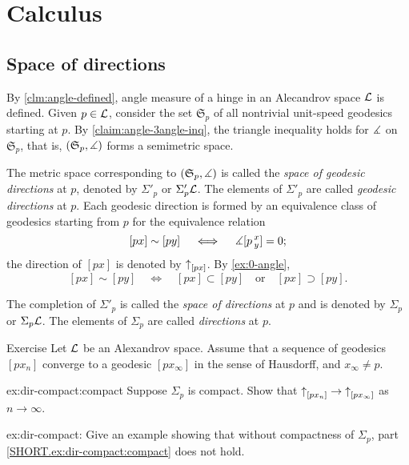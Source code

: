 
\chapter{Calculus}\label{chap:derivative}

\section{Space of directions} 
\label{sec:space+directions}

By \ref{clm:angle-defined}, angle measure of a hinge in an Alecandrov space $\mathcal{L}$ is defined.
Given $p\in \mathcal{L}$, consider the set $\mathfrak{S}_p$ of all nontrivial unit-speed geodesics starting at $p$.
By \ref{claim:angle-3angle-inq}, the triangle inequality holds for $\measuredangle$ on $\mathfrak{S}_p$,
that is, $(\mathfrak{S}_p,\measuredangle)$ 
forms a semimetric space.

The metric space corresponding to  $(\mathfrak{S}_p,\measuredangle)$ is called the \emph{space of geodesic directions} at $p$, denoted by $\Sigma'_p$ or $\Sigma'_p\mathcal{L}$.
The elements of $\Sigma'_p$ are called \emph{geodesic directions} at $p$.
Each geodesic direction is formed by an equivalence class of geodesics starting from $p$ 
for the equivalence relation 
\[[px]\sim[py]\quad \iff\quad \measuredangle[p\,{}^{x}_{y}]=0;\]
the direction of $[px]$ is denoted by ${\uparrow}_{[{p}{x}]} $.
By \ref{ex:0-angle}, 
\[[px]\sim[py]
\quad\iff\quad
[px]\subset [py]
\quad\text{or}\quad
[px]\supset[py].
\]
 
The completion of $\Sigma'_p$ is called the \emph{space of directions} at $p$ and is denoted by $\Sigma_p$ or $\Sigma_p\mathcal{L}$.
The elements of $\Sigma_p$ are called \emph{directions} at $p$.

\begin{thm}{Exercise}\label{ex:dir-compact}
Let $\mathcal{L}$ be an Alexandrov space.
Assume that a sequence of geodesics $[px_n]$ converge to a geodesic $[px_\infty]$ in the sense of Hausdorff,
and $x_\infty\ne p$.

\begin{subthm}{ex:dir-compact:compact}
Suppose $\Sigma_p$ is compact.
Show that ${\uparrow}_{[{p}{x_n}]}\to{\uparrow}_{[{p}{x_\infty}]}$ as $n\to\infty$.
\end{subthm}

\begin{subthm}{ex:dir-compact:}
Give an example showing that without compactness of $\Sigma_p$, part \ref{SHORT.ex:dir-compact:compact} does not hold.
\end{subthm}

\end{thm}



